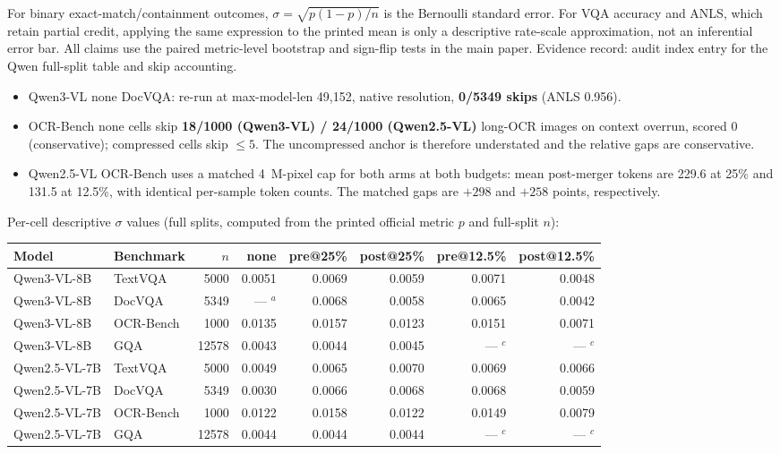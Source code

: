 \documentclass[journal]{IEEEtran}
\begin{document}
For binary exact-match/containment outcomes,
$\sigma=\sqrt{p(1-p)/n}$ is the Bernoulli standard error. For VQA accuracy and
ANLS, which retain partial credit, applying the same expression to the printed
mean is only a descriptive rate-scale approximation, not an inferential error
bar. All claims use the paired metric-level bootstrap and sign-flip tests in
the main paper. Evidence record: audit index entry for the Qwen full-split
table and skip accounting.

\begin{itemize}
  \item Qwen3-VL none DocVQA: re-run at max-model-len 49,152, native
    resolution, \textbf{0/5349 skips} (ANLS 0.956).
  \item OCR-Bench none cells skip \textbf{18/1000 (Qwen3-VL) / 24/1000
    (Qwen2.5-VL)} long-OCR images on context overrun, scored 0 (conservative);
    compressed cells skip $\leq 5$. The uncompressed anchor is therefore
    understated and the relative gaps are conservative.
  \item Qwen2.5-VL OCR-Bench uses a matched 4~M-pixel cap for both arms at
    both budgets: mean post-merger tokens are 229.6 at 25\% and 131.5 at
    12.5\%, with identical per-sample token counts. The matched gaps are
    $+298$ and $+258$ points, respectively.
\end{itemize}

\noindent Per-cell descriptive $\sigma$ values (full splits, computed from the
printed official metric $p$ and full-split $n$):

\begin{table}[ht]
  \centering
  \small
  \begin{tabular}{@{}l l r r r r r r@{}}
    \toprule
    Model & Benchmark & $n$ & none & pre@25\% & post@25\% & pre@12.5\% & post@12.5\% \\
    \midrule
    Qwen3-VL-8B   & TextVQA   & 5000  & 0.0051   & 0.0069 & 0.0059 & 0.0071 & 0.0048 \\
    Qwen3-VL-8B   & DocVQA    & 5349  & --- $^{a}$ & 0.0068 & 0.0058 & 0.0065 & 0.0042 \\
    Qwen3-VL-8B   & OCR-Bench & 1000  & 0.0135   & 0.0157 & 0.0123 & 0.0151 & 0.0071 \\
    Qwen3-VL-8B   & GQA       & 12578 & 0.0043   & 0.0044 & 0.0045 & --- $^{c}$ & --- $^{c}$ \\
    \midrule
    Qwen2.5-VL-7B & TextVQA   & 5000  & 0.0049   & 0.0065 & 0.0070 & 0.0069 & 0.0066 \\
    Qwen2.5-VL-7B & DocVQA    & 5349  & 0.0030   & 0.0066 & 0.0068 & 0.0068 & 0.0059 \\
    Qwen2.5-VL-7B & OCR-Bench & 1000  & 0.0122   & 0.0158 & 0.0122 & 0.0149 & 0.0079 \\
    Qwen2.5-VL-7B & GQA       & 12578 & 0.0044   & 0.0044 & 0.0044 & --- $^{c}$ & --- $^{c}$ \\
    \bottomrule
  \end{tabular}
\end{table}
\end{document}
